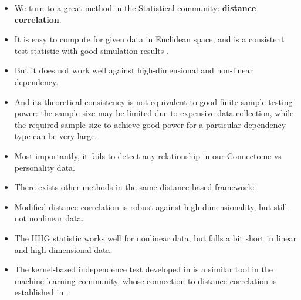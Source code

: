 \documentclass{beamer}
\begin{document}
\begin{frame}
\begin{itemize}[<+->]
\item We turn to a great method in the Statistical community: \textbf{distance correlation}.
\item It is easy to compute for given data in Euclidean space, and is a consistent test statistic with good simulation results \cite{SzekelyRizzoBakirov2007}.
\item But it does not work well against high-dimensional and non-linear dependency. 
\item And its theoretical consistency is not equivalent to good finite-sample testing power: the sample size may be limited due to expensive data collection, while the required sample size to achieve good power for a particular dependency type can be very large.
\item Most importantly, it fails to detect any relationship in our Connectome vs personality data.
\end{itemize}
\end{frame}

\begin{frame}
\begin{itemize}[<+->]
\item There exists other methods in the same distance-based framework: 
\item Modified distance correlation \cite{SzekelyRizzo2013a} is robust against high-dimensionality, but still not nonlinear data. 
\item The HHG statistic \cite{HellerGorfine2013} works well for nonlinear data, but falls a bit short in linear and high-dimensional data.
\item The kernel-based independence test developed in \cite{GrettonGyorfi2010} is a similar tool in the machine learning community, whose connection to distance correlation is established in \cite{SejdinovicEtAl2013}.
\end{itemize}
\end{frame}
\end{document}
